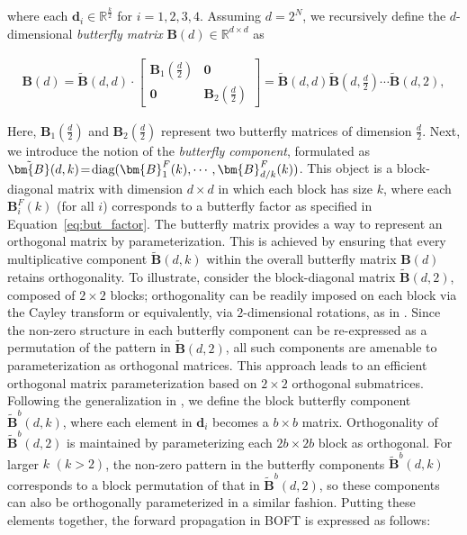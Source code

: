 where each $\bm{d}_i \in \mathbb{R}^{\frac{k}{2}}$ for $i=1,2,3,4$. Assuming $d = 2^N$, we recursively define the $d$-dimensional \emph{butterfly matrix} $\bm{B}(d) \in \mathbb{R}^{d \times d}$ as

\begin{equation}
\begin{aligned}
    \bm{B}(d) = \tilde{\bm{B}}(d, d) \cdot \begin{bmatrix}
    \bm{B}_1(\frac{d}{2}) & \bm{0} \\
    \bm{0} & \bm{B}_2(\frac{d}{2})
    \end{bmatrix} = \tilde{\bm{B}}(d, d) \tilde{\bm{B}}(d, \frac{d}{2}) \cdots \tilde{\bm{B}}(d, 2),
\end{aligned}
\end{equation}

Here, $\bm{B}_1(\frac{d}{2})$ and $\bm{B}_2(\frac{d}{2})$ represent two butterfly matrices of dimension $\frac{d}{2}$. Next, we introduce the notion of the \emph{butterfly component}, formulated as $\thickmuskip=2mu \medmuskip=2mu \tilde{\bm{B}}(d,k)=\text{diag}(\bm{B}^F_1(k),\cdots,\bm{B}^F_{d/k}(k))$. This object is a block-diagonal matrix with dimension $d\times d$ in which each block has size $k$, where each $\bm{B}^F_i(k)$ (for all $i$) corresponds to a butterfly factor as specified in Equation~\ref{eq:but_factor}. The butterfly matrix provides a way to represent an orthogonal matrix by parameterization. This is achieved by ensuring that every multiplicative component $\tilde{\bm{B}}(d,k)$ within the overall butterfly matrix $\bm{B}(d)$ retains orthogonality. To illustrate, consider the block-diagonal matrix $\tilde{\bm{B}}(d,2)$, composed of $2 \times 2$ blocks; orthogonality can be readily imposed on each block via the Cayley transform or equivalently, via $2$-dimensional rotations, as in \cite{liu2021orthogonal,qiu2023controlling}. Since the non-zero structure in each butterfly component can be re-expressed as a permutation of the pattern in $\tilde{\bm{B}}(d,2)$, all such components are amenable to parameterization as orthogonal matrices. This approach leads to an efficient orthogonal matrix parameterization based on $2\times2$ orthogonal submatrices. Following the generalization in \cite{chen2022pixelated}, we define the block butterfly component $\tilde{\bm{B}}^b(d,k)$, where each element in $\bm{d}_i$ becomes a $b \times b$ matrix. Orthogonality of $\tilde{\bm{B}}^b(d,2)$ is maintained by parameterizing each $2b\times2b$ block as orthogonal. For larger $k$ $(k>2)$, the non-zero pattern in the butterfly components $\tilde{\bm{B}}^b(d,k)$ corresponds to a block permutation of that in $\tilde{\bm{B}}^b(d,2)$, so these components can also be orthogonally parameterized in a similar fashion. Putting these elements together, the forward propagation in BOFT is expressed as follows:

